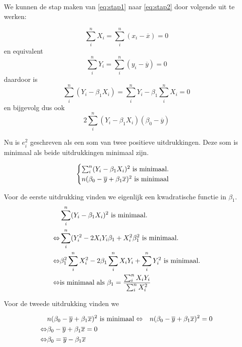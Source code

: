 \begin{theorem}
	We kunnen de stap maken van \ref{eq:stap1} naar \ref{eq:stap2} door volgende uit te werken:
	
\[ \sum_{i}^{n}X_i = \sum_{i}^{n} (x_i - \overline{x}) = 0 \]
	en equivalent
\[ \sum_{i}^{n}Y_i = \sum_{i}^{n} (y_i - \overline{y}) = 0 \]
daardoor is
\[ \sum_{i}^{n}(Y_i - \beta_1 X_i) = \sum_{i}^{n}Y_i - \beta_1 \sum_{i}^{n}X_i = 0 \]
en bijgevolg dus ook
\[ 2 \sum_{i}^{n}(Y_i - \beta_1 X_i)(\beta_0 - \overline{y}) \]
	

Nu is $e^{2}_{i}$ geschreven als een som van twee positieve uitdrukkingen. Deze som is minimaal als beide uitdrukkingen minimaal zijn.

  \begin{equation}
    \begin{cases}
      \sum_{i}^{n}( Y_{i} - \beta_{1} X_{i})^{2} \textnormal{ is minimaal.}\\
      n(\beta_{0} - \overline{y} + \beta_{1} \overline{x})^{2} \textnormal{ is minimaal}
    \end{cases}
    \label{eq:vgl}
  \end{equation}
	

Voor de eerste uitdrukking vinden we eigenlijk een kwadratische functie in $\beta_1$.
  \begin{eqnarray}
		& \sum_{i}^{n}( Y_{i} - \beta_{1} X_{i})^{2} \textnormal{ is minimaal.} \label{eq:uitdrukking}\\
		\Leftrightarrow & \sum_i^n (Y_i^2 - 2X_iY_i\beta_1 + X_i^2\beta_1^2 \textnormal{ is minimaal.} \\
		\Leftrightarrow & \beta_1^2 \sum_i^n X_i^2 - 2\beta_1 \sum_i^n X_iY_i + \sum_i^nY_i^2 \textnormal{ is minimaal.} \\
		\Leftrightarrow & \textnormal{is minimaal als } \beta_{1} = \frac{\sum_{i}^{n} X_{i}Y_{i}}{\sum_{i}^{n} X_{i}^{2}}
	\end{eqnarray}

Voor de tweede uitdrukking vinden we

  \begin{eqnarray}
		& n(\beta_{0} - \overline{y} + \beta_{1} \overline{x})^{2} \textnormal{ is minimaal}
		\Leftrightarrow & n(\beta_{0} - \overline{y} + \beta_{1} \overline{x})^{2} = 0 \\
		\Leftrightarrow & \beta_{0} - \overline{y} + \beta_{1} \overline{x} = 0 \\
		\Leftrightarrow & \beta_{0} = \overline{y} - \beta_{1}\overline{x} 
	\end{eqnarray}


\end{theorem}
